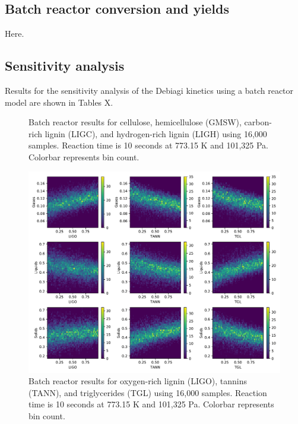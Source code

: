 \subsection{Batch reactor conversion and yields}

Here.

\subsection{Sensitivity analysis}

Results for the sensitivity analysis of the Debiagi kinetics using a batch reactor model are shown in Tables X.

\begin{figure}[H]
    \centering
    \caption{Batch reactor results for cellulose, hemicellulose (GMSW), carbon-rich lignin (LIGC), and hydrogen-rich lignin (LIGH) using 16,000 samples. Reaction time is 10 seconds at 773.15 K and 101,325 Pa. Colorbar represents bin count.}
\end{figure}

\begin{figure}[H]
    \centering
    \includegraphics[width=\textwidth]{figures/sa-hexbin2-n1000.pdf}
    \caption{Batch reactor results for oxygen-rich lignin (LIGO), tannins (TANN), and triglycerides (TGL) using 16,000 samples. Reaction time is 10 seconds at 773.15 K and 101,325 Pa. Colorbar represents bin count.}
\end{figure}


